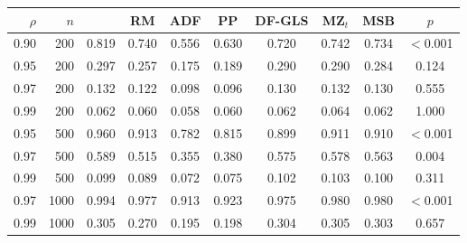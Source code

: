 \begin{tabular}{rrcccccccc}
\toprule
$\rho$ & $n$ & \RMGLS{} & RM & ADF & PP & DF-GLS & MZ$_t$ & MSB & $p$ \\
\midrule
0.90 & 200 & 0.819 & 0.740 & 0.556 & 0.630 & 0.720 & 0.742 & 0.734 & $<$0.001 \\
0.95 & 200 & 0.297 & 0.257 & 0.175 & 0.189 & 0.290 & 0.290 & 0.284 & 0.124 \\
0.97 & 200 & 0.132 & 0.122 & 0.098 & 0.096 & 0.130 & 0.132 & 0.130 & 0.555 \\
0.99 & 200 & 0.062 & 0.060 & 0.058 & 0.060 & 0.062 & 0.064 & 0.062 & 1.000 \\
0.95 & 500 & 0.960 & 0.913 & 0.782 & 0.815 & 0.899 & 0.911 & 0.910 & $<$0.001 \\
0.97 & 500 & 0.589 & 0.515 & 0.355 & 0.380 & 0.575 & 0.578 & 0.563 & 0.004 \\
0.99 & 500 & 0.099 & 0.089 & 0.072 & 0.075 & 0.102 & 0.103 & 0.100 & 0.311 \\
0.97 & 1000 & 0.994 & 0.977 & 0.913 & 0.923 & 0.975 & 0.980 & 0.980 & $<$0.001 \\
0.99 & 1000 & 0.305 & 0.270 & 0.195 & 0.198 & 0.304 & 0.305 & 0.303 & 0.657 \\
\bottomrule
\end{tabular}
